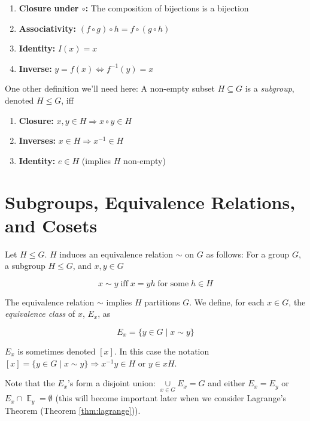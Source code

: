 \documentclass{article}
\theoremstyle{definition}
\DeclareMathOperator{\E}{\mathbb{E}}
\begin{document}
\begin{enumerate}
\item \textbf{Closure under $\circ$:} The composition of bijections 
			  is a bijection
\item \textbf{Associativity:} $(f \circ g) \circ h = f \circ (g \circ h)$
\item \textbf{Identity: } $I(x) = x$
\item \textbf{Inverse:} $y = f(x) \Leftrightarrow f^{-1}(y) = x$
\end{enumerate}


\bigskip
\noindent
One other definition we'll need here: A non-empty subset $H
\subseteq G$ is a \emph{subgroup}, denoted $H \leq G$, iff

\begin{enumerate}
\item \textbf{Closure:}  $x,y \in H  \Rightarrow x \circ y \in H$
\item \textbf{Inverses:} $x \in H \Rightarrow x^{-1} \in H$
\item \textbf{Identity:} $e \in H$  (implies $H$ non-empty)
\end{enumerate}

\section{Subgroups, Equivalence Relations, and Cosets}

Let $H \leq G$. $H$ induces an equivalence relation $\sim$ on $G$
as follows: For a group $G$, a subgroup $H \leq G$, and $x,y \in G$

\begin{equation}
x \sim y \; \text{iff} \; x = yh \;\text{for some}\;  h \in H
\label{eqn:er}
\end{equation}

\medskip
\noindent
The equivalence relation $\sim$ implies $H$ partitions $G$. We
define, for each $x \in G$, the \emph{equivalence class} of 
$x$, $E_{x}$, as


\begin{equation}
E_x = \{y \in G \mid x \sim y \}
\label{eqn:E_x}
\end{equation}

\medskip
\noindent
$E_x$ is sometimes denoted $[x]$.  In this case the notation $[x]
= \{y \in G \mid x \sim y\} \Rightarrow x^{-1}y \in H$ or $y \in
xH$. 

\bigskip
\noindent
Note that the $E_x$'s form a disjoint union: $\underset{x \in
G}{\cup} E_x = G$ and either $E_x = E_y$ or $E_x \cap \E_y =
\emptyset$ (this will become important later when we consider
Lagrange's Theorem (Theorem \ref{thm:lagrange})). 
\end{document}
